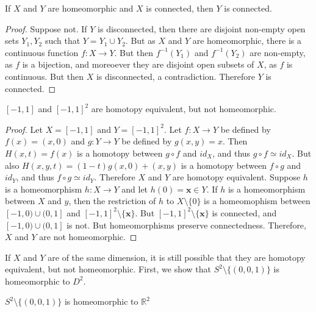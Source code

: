 \documentclass[crop=false,class=article,oneside]{standalone}
\begin{document}
        \begin{theorem}
            If $X$ and $Y$ are homeomorphic and
            $X$ is connected, then $Y$ is connected.
        \end{theorem}
        \begin{proof}
            Suppose not. If $Y$ is disconnected, then
            there are disjoint non-empty open sets $Y_{1},Y_{2}$
            such that $Y=Y_{1}\cup{Y_{2}}$. But as $X$ and $Y$
            are homeomorphic, there is a continuous function
            $f:X\rightarrow{Y}$. But then
            $f^{-1}(Y_{1})$ and $f^{-1}(Y_{2})$ are
            non-empty, as $f$ is a bijection, and moreoever
            they are disjoint open subsets of $X$, as
            $f$ is continuous. But then $X$ is disconnected,
            a contradiction. Therefore $Y$ is connected.
        \end{proof}
        \begin{theorem}
            $[-1,1]$ and $[-1,1]^{2}$ are homotopy equivalent,
            but not homeomorphic.
        \end{theorem}
        \begin{proof}
            Let $X=[-1,1]$ and $Y=[-1,1]^{2}$.
            Let $f:X\rightarrow{Y}$ be defined by
            $f(x)=(x,0)$ and $g:Y\rightarrow{Y}$ be defined
            by $g(x,y)=x$.
            Then $H(x,t)=f(x)$ is a homotopy between
            $g\circ{f}$ and $id_{X}$, and thus
            $g\circ{f}\simeq{id_{X}}$. But also
            $H(x,y,t)=(1-t)g(x,0)+(x,y)$ is a homotopy
            between $f\circ{g}$ and $id_{Y}$, and thus
            $f\circ{g}\simeq{id_{Y}}$. Therefore $X$ and $Y$
            are homotopy equivalent. Suppose $h$ is a
            homeomorphism $h:X\rightarrow{Y}$ and let
            $h(0)=\mathbf{x}\in{Y}$. If $h$ is a homeomorphism
            between $X$ and $y$, then the restriction of
            $h$ to $X\setminus\{0\}$ is a homeomophism
            between $[-1,0)\cup(0,1]$ and
            $[-1,1]^{2}\setminus\{\mathbf{x}\}$. But
            $[-1,1]^{2}\setminus\{\mathbf{x}\}$ is connected,
            and $[-1,0)\cup(0,1]$ is not. But homeomorphisms
            preserve connectedness. Therefore, $X$ and
            $Y$ are not homeomorphic.
        \end{proof}
        If $X$ and $Y$ are of the same dimension,
        it is still possible that they are homotopy equivalent,
        but not homeomorphic. First, we show that
        $S^{2}\setminus\{(0,0,1)\}$ is homeomorphic to $D^{2}$.
        \begin{theorem}
            \label{%
                theorem:surgery_theory_the_sphere_%
                with_a_point_removed_is_homeomorphic_%
                to_the_plane%
            }
            $S^{2}\setminus\{(0,0,1)\}$ is
            homeomorphic to $\mathbb{R}^{2}$
        \end{theorem}
\end{document}
